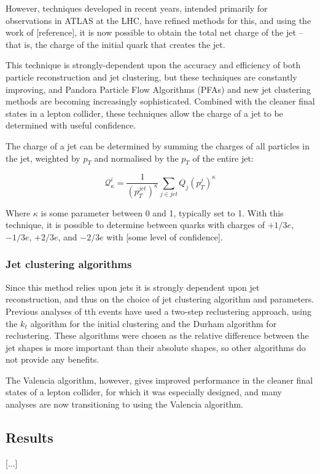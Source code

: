 However, techniques developed in recent years, intended primarily for observations in ATLAS at the LHC, have refined methods for this, and using the work of [reference], it is now possible to obtain the total net charge of the jet -- that is, the charge of the initial quark that creates the jet. 

This technique is strongly-dependent upon the accuracy and efficiency of both particle reconstruction and jet clustering, but these techniques are constantly improving, and Pandora Particle Flow Algorithms (PFAs) and new jet clustering methods are becoming increasingly sophisticated. Combined with the cleaner final states in a lepton collider, these techniques allow the charge of a jet to be determined with useful confidence.

The charge of a jet can be determined by summing the charges of all particles in the jet, weighted by $p_T$ and normalised by the $p_T$ of the entire jet:
		
\begin{displaymath}
	\mathcal{Q}_\kappa^i = \frac{1}{(p_T^{jet})^\kappa} \sum_{j \in jet} Q_j (p_T^j)^\kappa
\end{displaymath}

Where $\kappa$ is some parameter between 0 and 1, typically set to 1. With this technique, it is possible to determine between quarks with charges of $+1/3e$, $-1/3e$, $+2/3e$, and $-2/3e$ with [some level of confidence].

\subsubsection{Jet clustering algorithms}
Since this method relies upon jets it is strongly dependent upon jet reconstruction, and thus on the choice of jet clustering algorithm and parameters. Previous analyses of tth events have used a two-step reclustering approach, using the $k_t$ algorithm for the initial clustering and the Durham algorithm for reclustering. These algorithms were chosen as the relative difference between the jet shapes is more important than their absolute shapes, so other algorithms do not provide any benefits.

The Valencia algorithm, however, gives improved performance in the cleaner final states of a lepton collider, for which it was especially designed, and many analyses are now transitioning to using the Valencia algorithm.

\subsection{Results}
[...]